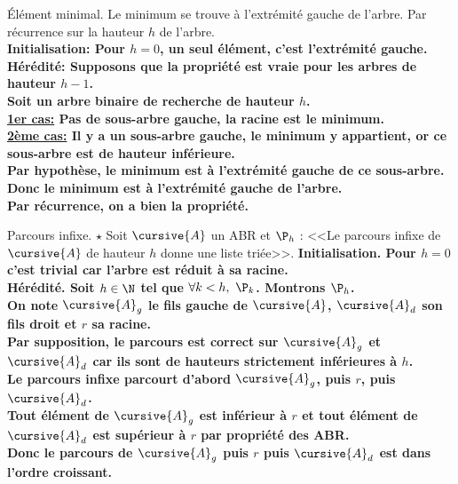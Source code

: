 \documentclass[french, 11pt]{article}
\begin{document}
\vspace*{-0.7cm}

\begin{prop}{Élément minimal.}{}
    Le minimum se trouve à l'extrémité gauche de l'arbre.
    \tcblower
    Par récurrence sur la hauteur $h$ de l'arbre.\\
    \bf{Initialisation:} Pour $h=0$, un seul élément, c'est l'extrémité gauche.\\
    \bf{Hérédité:} Supposons que la propriété est vraie pour les arbres de hauteur $h-1$.\\
    Soit un arbre binaire de recherche de hauteur $h$.\\
    \underline{1er cas:} Pas de sous-arbre gauche, la racine est le minimum.\\
    \underline{2ème cas:} Il y a un sous-arbre gauche, le minimum y appartient, or ce sous-arbre est de hauteur inférieure.\\
    Par hypothèse, le minimum est à l'extrémité gauche de ce sous-arbre.\\
    Donc le minimum est à l'extrémité gauche de l'arbre.\\
    Par récurrence, on a bien la propriété.
\end{prop}

\begin{prop}{Parcours infixe. $\star$}{}
    Soit $\cursive{A}$ un ABR et $\P_h$ : <<Le parcours infixe de $\cursive{A}$ de hauteur $h$ donne une liste triée>>.
    \tcblower
    \bf{Initialisation.} Pour $h=0$ c'est trivial car l'arbre est réduit à sa racine.\\
    \bf{Hérédité.} Soit $h\in\N$ tel que $\forall k < h, ~ \P_k$. Montrons $\P_h$.\\
    On note $\cursive{A}_g$ le fils gauche de $\cursive{A}$, $\cursive{A}_d$ son fils droit et $r$ sa racine.\\
    Par supposition, le parcours est correct sur $\cursive{A}_g$ et $\cursive{A}_d$ car ils sont de hauteurs strictement inférieures à $h$.\\
    Le parcours infixe parcourt d'abord $\cursive{A}_g$, puis $r$, puis $\cursive{A}_d$.\\
    Tout élément de $\cursive{A}_g$ est inférieur à $r$ et tout élément de $\cursive{A}_d$ est supérieur à $r$ par propriété des ABR.\\
    Donc le parcours de $\cursive{A}_g$ puis $r$ puis $\cursive{A}_d$ est dans l'ordre croissant.
\end{prop}
\end{document}

